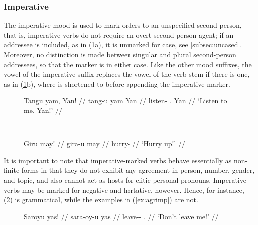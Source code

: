 
\subsubsection{Imperative}

The imperative mood is used to mark orders to an unspecified second person,
that is, imperative verbs do not require an overt second person agent; if an
addressee is included, as in (\ref{ex:impmorph}a), it is unmarked for case,
see \autoref{subsec:uncased}. Moreover, no distinction is made between singular
and plural second-person addressees, so that the marker is  in
either case. Like the other mood suffixes, the vowel of the imperative suffix
replaces the vowel of the verb stem if there is one, as in
(\ref{ex:impmorph}b), where  is shortened to
 before appending the imperative marker.

\begin{figure}[h]
\ex{}\label{ex:impmorph}
\begin{minipage}[t]{.5\remaining}
\tl\quad\begingl
	\gla Tangu yām, Yan! //
	\glb tang-u yām Yan //
	\glc listen-\Imp{} \Fsg{}.\Dat{} Yan //
	\glft `Listen to me, Yan!' //
\endgl
\end{minipage}
~
\begin{minipage}[t]{.5\remaining}
\tl\quad\begingl
	\gla Giru māy! //
	\glb gira-u māy //
	\glc hurry-\Imp{} \Int{} //
	\glft `Hurry up!' //
\endgl
\end{minipage}

\xe
\end{figure}

It is important to note that imperative-marked verbs behave essentially as
non-finite forms in that they do not exhibit any agreement in person, number,
gender, and topic, and also cannot act as hosts for clitic personal pronouns.
Imperative verbs may be marked for negative and hortative, however. Hence, for
instance, (\ref{ex:negimp}) is grammatical, while the examples in
(\ref{ex:agrimp}) are not.

\begin{figure}[h]
\ex\label{ex:negimp}\begingl
	\gla Saroyu yas! //
	\glb sara-oy-u yas //
	\glc leave-\Neg{}-\Imp{} \Fsg{}.\Parg{} //
	\glft `Don't leave me!' //
\endgl\xe
\end{figure}


